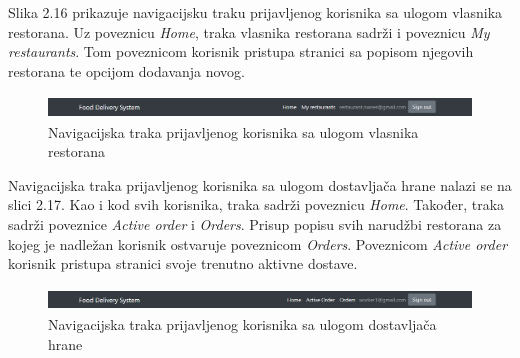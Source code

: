 \documentclass[times, utf8, zavrsni, numeric]{fer}
\begin{document}
Slika 2.16 prikazuje navigacijsku traku prijavljenog korisnika sa ulogom vlasnika restorana. Uz poveznicu \emph{Home}, traka vlasnika restorana sadrži i poveznicu \emph{My restaurants}. Tom poveznicom korisnik pristupa stranici sa popisom njegovih restorana te opcijom dodavanja novog.
\begin{figure}[htb]
\centering
\includegraphics[height=0.6cm]{pocetna-vlasnik.png}
\caption{Navigacijska traka prijavljenog korisnika sa ulogom vlasnika restorana}
\label{fig:pocVlas}
\end{figure}

Navigacijska traka prijavljenog korisnika sa ulogom dostavljača hrane nalazi se na slici 2.17. Kao i kod svih korisnika, traka sadrži poveznicu \emph{Home}. Također, traka sadrži poveznice \emph{Active order} i \emph{Orders}. Prisup popisu svih narudžbi restorana za kojeg je nadležan korisnik ostvaruje poveznicom \emph{Orders}. Poveznicom \emph{Active order} korisnik pristupa stranici svoje trenutno aktivne dostave.
\begin{figure}[htb]
\centering
\includegraphics[height=0.6cm]{pocetna-dostavljac.png}
\caption{Navigacijska traka prijavljenog korisnika sa ulogom dostavljača hrane}
\label{fig:pocDost}
\end{figure}
\end{document}
